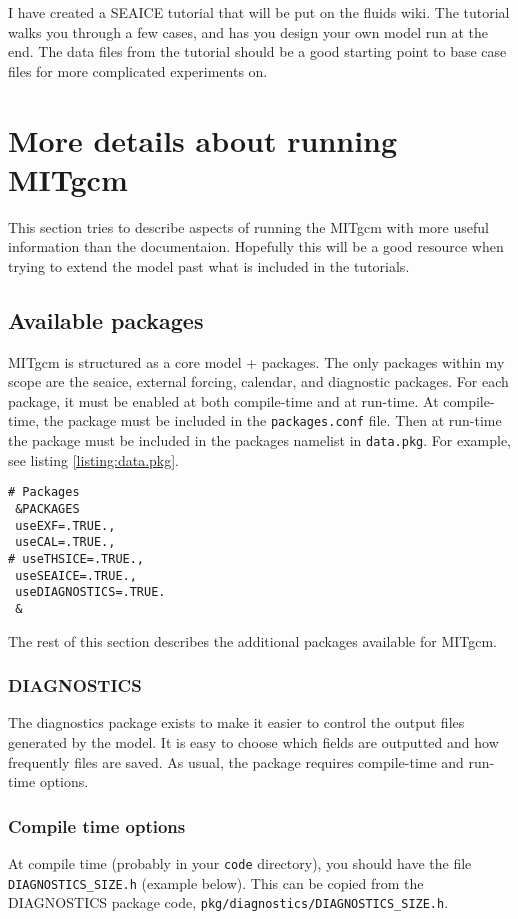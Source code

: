 \documentclass[11pt]{article}
\begin{document}
I have created a SEAICE tutorial that will be put on the fluids wiki. The tutorial walks you through a few cases, and has you design your own model run at the end. The data files from the tutorial should be a good starting point to base case files for more complicated experiments on.

\section{More details about running MITgcm}
This section tries to describe aspects of running the MITgcm with more useful information than the documentaion. Hopefully this will be a good resource when trying to extend the model past what is included in the tutorials.

\subsection{Available packages}
MITgcm is structured as a core model + packages. The only packages within my scope are the seaice, external forcing, calendar, and diagnostic packages. For each package, it must be enabled at both compile-time and at run-time. At compile-time, the package must be included in the \verb|packages.conf| file. Then at run-time the package must be included in the packages namelist in \verb|data.pkg|. For example, see listing \ref{listing:data.pkg}.

\begin{lstlisting}[caption={Sample data.pkg file. This would enable the EXF, CAL, SEAICE, and DIAGNOSTICS packages, and disable the THSICE package.}, label={listing:data.pkg}]
# Packages
 &PACKAGES
 useEXF=.TRUE.,
 useCAL=.TRUE.,
# useTHSICE=.TRUE.,
 useSEAICE=.TRUE.,
 useDIAGNOSTICS=.TRUE.
 &
\end{lstlisting}

The rest of this section describes the additional packages available for MITgcm.

\subsubsection{DIAGNOSTICS}
The diagnostics package exists to make it easier to control the output files generated by the model. It is easy to choose which fields are outputted and how frequently files are saved. As usual, the package requires compile-time and run-time options.

\subsubsection*{Compile time options}
At compile time (probably in your \verb|code| directory), you should have the file \verb|DIAGNOSTICS_SIZE.h| (example below). This can be copied from the DIAGNOSTICS package code, \verb|pkg/diagnostics/DIAGNOSTICS_SIZE.h|.
\end{document}
